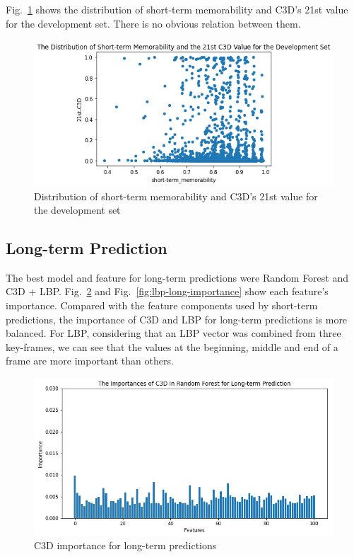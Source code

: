 \documentclass[conference, compsoc]{IEEEtran}
\begin{document}
{Fig.~\ref{fig:c3d-and-short-memo-distribution} shows the distribution of short-term memorability and C3D's 21st value for the development set.
There is no obvious relation between them.

\begin{figure}[htbp]
    \centerline{\includegraphics[width=\linewidth]{figures/c3d-and-short-memo-distribution.png}}
    \caption{Distribution of short-term memorability and C3D's 21st value for the development set}
    \label{fig:c3d-and-short-memo-distribution}
\end{figure}

\subsection{Long-term Prediction}
The best model and feature for long-term predictions were Random Forest and C3D + LBP.
Fig.~\ref{fig:c3d-long-importance} and Fig.~\ref{fig:lbp-long-importance} show each feature's importance.
Compared with the feature components used by short-term predictions, the importance of C3D and LBP for long-term predictions is more balanced.
For LBP, considering that an LBP vector was combined from three key-frames, we can see that the values at the beginning, middle and end of a frame are more important than others.

\begin{figure}[htbp]
    \centerline{\includegraphics[width=\linewidth]{figures/c3d-long-importance.png}}
    \caption{C3D importance for long-term predictions}
    \label{fig:c3d-long-importance}
\end{figure}

}
\end{document}
